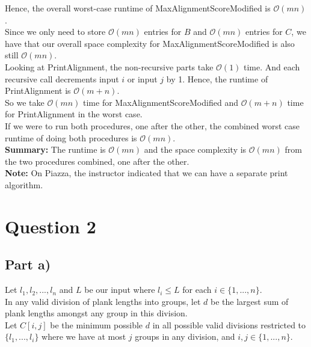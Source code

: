 \documentclass[12pt]{article}
\begin{document}
Hence, the overall worst-case runtime of MaxAlignmentScoreModified is $\mathcal{O}(mn)$. \\

Since we only need to store $\mathcal{O}(mn)$ entries for $B$ and $\mathcal{O}(mn)$ entries for $C$, we have that our overall space complexity for MaxAlignmentScoreModified is also still $\mathcal{O}(mn)$. \\

Looking at PrintAlignment, the non-recursive parts take $\mathcal{O}(1)$ time. And each recursive call decrements input $i$ or input $j$ by 1. Hence, the runtime of PrintAlignment is $\mathcal{O}(m+n)$. \\


So we take $\mathcal{O}(mn)$ time for MaxAlignmentScoreModified and $\mathcal{O}(m+n)$ time for PrintAlignment in the worst case. \\

If we were to run both procedures, one after the other, the combined worst case runtime of doing both procedures is $\mathcal{O}(mn)$. \\

\textbf{Summary:} The runtime is $\mathcal{O}(mn)$ and the space complexity is $\mathcal{O}(mn)$ from the two procedures combined, one after the other. \\

\textbf{Note:} On Piazza, the instructor indicated that we can have a separate print algorithm. 

\newpage

\section*{Question 2}

\subsection*{Part a)}

Let $l_1,l_2,...,l_n$ and $L$ be our input where $l_i \leq L$ for each $i \in \{1,...,n\}$. \\

In any valid division of plank lengths into groups, let $d$ be the largest sum of plank lengths amongst any group in this division. \\

Let $C[i,j]$ be the minimum possible $d$ in all possible valid divisions restricted to $\{l_1,...,l_i\}$ where we have at most $j$ groups in any division, and $i,j \in \{1,...,n\}$. \\
\end{document}
